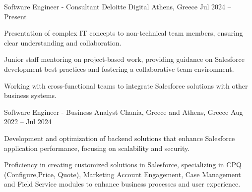 

\begin{cventries}

  \cventry
    {Software Engineer - Consultant} %
    {Deloitte Digital} %
    {Athens, Greece} %
    {Jul 2024 -- Present} %
    {
      \begin{cvitems} %
        \item {Presentation of complex IT concepts to non-technical team members, ensuring clear understanding and collaboration.}
        \item {Junior staff mentoring on project-based work, providing guidance on Salesforce development best practices and fostering a collaborative team environment.}
        \item {Working with cross-functional teams to integrate Salesforce solutions with other business systems.}
      \end{cvitems}
    }

  \cventry
    {Software Engineer - Business Analyst} %
    {} %
    {Chania, Greece and Athens, Greece} %
    {Aug 2022 -- Jul 2024} %
    {
      \begin{cvitems} %
        \item {Development and optimization of backend solutions that enhance Salesforce application performance, focusing on scalability and security.}
        \item {Proficiency in creating customized solutions in Salesforce, specializing in CPQ (Configure,Price, Quote), Marketing Account Engagement, Case Management and Field Service modules to enhance business processes and user experience.}
      \end{cvitems}
    }

\end{cventries}
